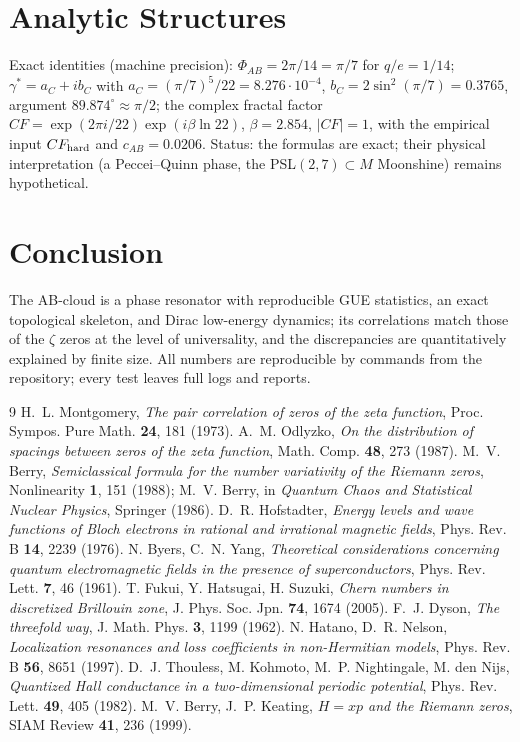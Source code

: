 \documentclass[11pt,a4paper]{article}
\begin{document}
\section{Analytic Structures}
Exact identities (machine precision): $\Phi_{AB}=2\pi/14=\pi/7$ for $q/e=1/14$; $\gamma^\ast=a_C+ib_C$ with $a_C=(\pi/7)^5/22=8.276\cdot10^{-4}$, $b_C=2\sin^2(\pi/7)=0.3765$, argument $89.874^\circ\approx\pi/2$; the complex fractal factor $CF=\exp(2\pi i/22)\exp(i\beta\ln22)$, $\beta=2.854$, $|CF|=1$, with the empirical input $CF_{\rm hard}$ and $c_{AB}=0.0206$. Status: the formulas are exact; their physical interpretation (a Peccei--Quinn phase, the PSL$(2,7)\subset M$ Moonshine) remains hypothetical.

\section{Conclusion}
The AB-cloud is a phase resonator with reproducible GUE statistics, an exact topological skeleton, and Dirac low-energy dynamics; its correlations match those of the $\zeta$ zeros at the level of universality, and the discrepancies are quantitatively explained by finite size. All numbers are reproducible by commands from the repository; every test leaves full logs and reports.

\begin{thebibliography}{9}
 H.~L. Montgomery, \emph{The pair correlation of zeros of the zeta function}, Proc. Sympos. Pure Math. \textbf{24}, 181 (1973).
 A.~M. Odlyzko, \emph{On the distribution of spacings between zeros of the zeta function}, Math. Comp. \textbf{48}, 273 (1987).
 M.~V. Berry, \emph{Semiclassical formula for the number variativity of the Riemann zeros}, Nonlinearity \textbf{1}, 151 (1988); M.~V. Berry, in \emph{Quantum Chaos and Statistical Nuclear Physics}, Springer (1986).
 D.~R. Hofstadter, \emph{Energy levels and wave functions of Bloch electrons in rational and irrational magnetic fields}, Phys. Rev. B \textbf{14}, 2239 (1976).
 N. Byers, C.~N. Yang, \emph{Theoretical considerations concerning quantum electromagnetic fields in the presence of superconductors}, Phys. Rev. Lett. \textbf{7}, 46 (1961).
 T. Fukui, Y. Hatsugai, H. Suzuki, \emph{Chern numbers in discretized Brillouin zone}, J. Phys. Soc. Jpn. \textbf{74}, 1674 (2005).
 F.~J. Dyson, \emph{The threefold way}, J. Math. Phys. \textbf{3}, 1199 (1962).
 N. Hatano, D.~R. Nelson, \emph{Localization resonances and loss coefficients in non-Hermitian models}, Phys. Rev. B \textbf{56}, 8651 (1997).
 D.~J. Thouless, M. Kohmoto, M.~P. Nightingale, M. den Nijs, \emph{Quantized Hall conductance in a two-dimensional periodic potential}, Phys. Rev. Lett. \textbf{49}, 405 (1982).
 M.~V. Berry, J.~P. Keating, \emph{$H=xp$ and the Riemann zeros}, SIAM Review \textbf{41}, 236 (1999).
\end{thebibliography}
\end{document}
